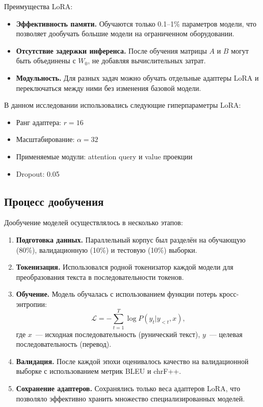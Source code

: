 \documentclass[14pt,a4paper]{extreport}
\begin{document}
Преимущества LoRA:
\begin{itemize}
    \item \textbf{Эффективность памяти.} Обучаются только 0.1--1\% параметров модели, что позволяет дообучать большие модели на ограниченном оборудовании.
    \item \textbf{Отсутствие задержки инференса.} После обучения матрицы $A$ и $B$ могут быть объединены с $W_0$, не добавляя вычислительных затрат.
    \item \textbf{Модульность.} Для разных задач можно обучать отдельные адаптеры LoRA и переключаться между ними без изменения базовой модели.
\end{itemize}

В данном исследовании использовались следующие гиперпараметры LoRA:
\begin{itemize}
    \item Ранг адаптера: $r = 16$
    \item Масштабирование: $\alpha = 32$
    \item Применяемые модули: attention query и value проекции
    \item Dropout: 0.05
\end{itemize}

\subsection{Процесс дообучения}

Дообучение моделей осуществлялось в несколько этапов:

\begin{enumerate}
    \item \textbf{Подготовка данных.} Параллельный корпус был разделён на обучающую (80\%), валидационную (10\%) и тестовую (10\%) выборки.
    
    \item \textbf{Токенизация.} Использовался родной токенизатор каждой модели для преобразования текста в последовательности токенов.
    
    \item \textbf{Обучение.} Модель обучалась с использованием функции потерь кросс-энтропии:
    \begin{equation}
    \mathcal{L} = -\sum_{t=1}^{T} \log P(y_t | y_{<t}, x),
    \end{equation}
    где $x$~--- исходная последовательность (рунический текст), $y$~--- целевая последовательность (перевод).
    
    \item \textbf{Валидация.} После каждой эпохи оценивалось качество на валидационной выборке с использованием метрик BLEU и chrF++.
    
    \item \textbf{Сохранение адаптеров.} Сохранялись только веса адаптеров LoRA, что позволяло эффективно хранить множество специализированных моделей.
\end{enumerate}
\end{document}
